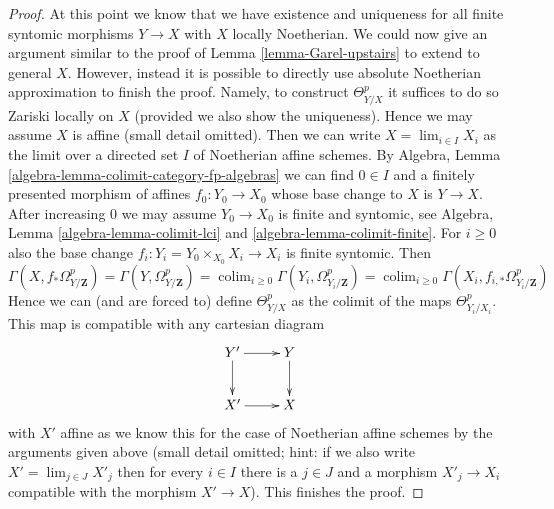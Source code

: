 \documentclass[10pt,a4paper]{amsart}
\theoremstyle{plain}
\theoremstyle{definition}
\theoremstyle{remark}
\numberwithin{equation}{subsection}
\def\lim{\mathop{\mathrm{lim}}\nolimits}
\def\colim{\mathop{\mathrm{colim}}\nolimits}
\begin{document}
\begin{proof}
\medskip\noindent
At this point we know that we have existence and uniqueness
for all finite syntomic morphisms $Y \to X$ with $X$ locally Noetherian.
We could now give an argument similar to the proof of
Lemma \ref{lemma-Garel-upstairs} to extend to general $X$.
However, instead it is possible to directly use
absolute Noetherian approximation to finish the proof.
Namely, to construct $\Theta^p_{Y/X}$
it suffices to do so Zariski locally on $X$ (provided we also
show the uniqueness). Hence we may assume $X$ is affine (small
detail omitted). Then we can write $X = \lim_{i \in I} X_i$
as the limit over a directed set $I$ of Noetherian affine schemes.
By Algebra, Lemma \ref{algebra-lemma-colimit-category-fp-algebras}
we can find $0 \in I$ and a finitely
presented morphism of affines $f_0 : Y_0 \to X_0$ whose base change to
$X$ is $Y \to X$. After increasing $0$ we may assume $Y_0 \to X_0$
is finite and syntomic, see
Algebra, Lemma \ref{algebra-lemma-colimit-lci} and
\ref{algebra-lemma-colimit-finite}. For $i \geq 0$ also the
base change $f_i : Y_i = Y_0 \times_{X_0} X_i \to X_i$ is finite syntomic.
Then
$$
\Gamma(X, f_*\Omega^p_{Y/\mathbf{Z}}) =
\Gamma(Y, \Omega^p_{Y/\mathbf{Z}}) =
\colim_{i \geq 0} \Gamma(Y_i, \Omega^p_{Y_i/\mathbf{Z}}) =
\colim_{i \geq 0} \Gamma(X_i, f_{i, *}\Omega^p_{Y_i/\mathbf{Z}})
$$
Hence we can (and are forced to) define $\Theta^p_{Y/X}$ as the colimit
of the maps $\Theta^p_{Y_i/X_i}$. This map is compatible with any
cartesian diagram
$$
\xymatrix{
Y' \ar[r] \ar[d] & Y \ar[d] \\
X' \ar[r] & X
}
$$
with $X'$ affine as we know this for the case of Noetherian affine schemes
by the arguments given above (small detail omitted; hint: if we also
write $X' = \lim_{j \in J} X'_j$ then for every $i \in I$ there is a $j \in J$
and a morphism $X'_j \to X_i$ compatible with the morphism $X' \to X$).
This finishes the proof.
\end{proof}
\end{document}
